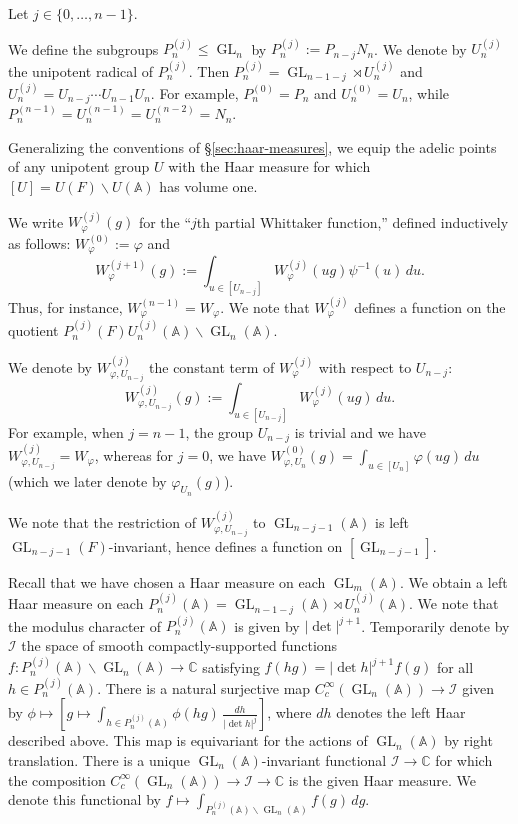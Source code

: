 \documentclass[reqno]{amsart}
\DeclareMathOperator{\GL}{GL}
\theoremstyle{plain} \newtheorem{theorem} {Theorem}
\theoremstyle{definition} \newtheorem{definition} [theorem] {Definition}
\theoremstyle{itplain} %
\numberwithin{equation}{section}
\numberwithin{theorem}{section}
\renewcommand{\leq}{\leqslant}
\begin{document}
Let $j \in \{0, \dotsc, n-1\}$.

We define the subgroups $P_n^{(j)} \leq \GL_n$ by $P_n^{(j)} := P_{n-j} N_n$.  We denote by $U_n^{(j)}$ the unipotent radical of $P_n^{(j)}$.  Then $P_n^{(j)} = \GL_{n-1-j} \rtimes U_n^{(j)}$ and $U_n^{(j)} = U_{n-j} \dotsb U_{n-1} U_n$.  For example, $P_n^{(0)} = P_n$ and $U_n^{(0)} = U_n$, while $P_n^{(n-1)} = U_n^{(n-1)} = U_n^{(n-2)} = N_n$.

Generalizing the conventions of \S\ref{sec:haar-measures}, we equip the adelic points of any unipotent group $U$ with the Haar measure for which $[U] = U(F) \backslash U(\mathbb{A})$ has volume one.  

We write $W^{(j)}_\varphi(g)$ for the ``$j$th partial Whittaker function,'' defined inductively as follows: $W_\varphi^{(0)} := \varphi$ and
\begin{equation*}
  W_{\varphi}^{(j+1)}(g) := \int _{u \in [U_{n-j}]} W_\varphi^{(j)}(u g) \psi^{-1}(u) \, d u.
\end{equation*}
Thus, for instance, $W_\varphi^{(n-1)} = W_\varphi$.   We note that $W_\varphi^{(j)}$ defines a function on the quotient $ P_n^{(j)}(F) U_n^{(j)}(\mathbb{A}) \backslash \GL_n(\mathbb{A})$.

We denote by $W^{(j)}_{\varphi,U_{n-j}}$ the constant term of $W^{(j)}_{\varphi}$ with respect to $U_{n-j}$:
\begin{equation*}
  W^{(j)}_{\varphi,U_{n-j}}(g) :=
  \int _{u \in [U_{n-j}]} W_\varphi^{(j)}(u g) \, d u.
\end{equation*}
For example, when $j = n-1$, the group $U_{n-j}$ is trivial and we have $W_{\varphi,U_{n-j}}^{(j)} = W_{\varphi}$, whereas for $j=0$, we have $W_{\varphi,U_{n}}^{(0)}(g) = \int _{u \in [U_n]} \varphi(u g) \, d u$ (which we  later denote by $\varphi_{U_n}(g)$).

We note that the restriction of $W_{\varphi,U_{n-j}}^{(j)}$ to $\GL_{n-j-1}(\mathbb{A})$ is left $\GL_{n-j-1}(F)$-invariant, hence defines a function on $[\GL_{n-j-1}]$.

Recall that we have chosen a Haar measure on each $\GL_m(\mathbb{A})$.  We obtain a left Haar measure on each $P_n^{(j)}(\mathbb{A}) = \GL_{n-1-j}(\mathbb{A}) \rtimes U_n^{(j)}(\mathbb{A})$.  We note that the modulus character of $P_n^{(j)}(\mathbb{A})$ is given by $|\det|^{j+1}$.  Temporarily denote by $\mathcal{I}$ the space of smooth compactly-supported functions $f : P_n^{(j)}(\mathbb{A}) \backslash \GL_n(\mathbb{A}) \rightarrow \mathbb{C}$ satisfying $f(h g) = |\det h|^{j+1} f(g)$ for all $h \in P_n^{(j)}(\mathbb{A})$.  There is a natural surjective map $C_c^\infty(\GL_n(\mathbb{A})) \rightarrow \mathcal{I}$ given by $\phi \mapsto [g \mapsto \int_{h \in P_{n}^{(j)}(\mathbb{A})} \phi(h g) \, \frac{d h}{|\det h|^{j}}]$, where $d h$ denotes the left Haar described above.  This map is equivariant for the actions of $\GL_n(\mathbb{A})$ by right translation.  There is a unique $\GL_n(\mathbb{A})$-invariant functional $\mathcal{I} \rightarrow \mathbb{C}$ for which the composition $C_c^\infty(\GL_n(\mathbb{A})) \rightarrow \mathcal{I} \rightarrow \mathbb{C}$ is the given Haar measure.  We denote this functional by $f \mapsto \int _{P_n^{(j)}(\mathbb{A}) \backslash \GL_n(\mathbb{A})} f(g) \, d g$.
\end{document}

